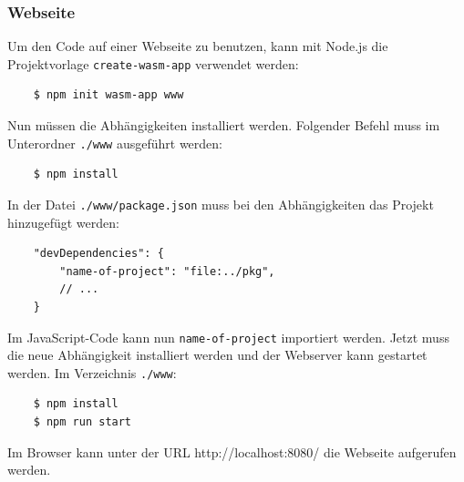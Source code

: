 \subsubsection{Webseite}

Um den Code auf einer Webseite zu benutzen, kann mit Node.js die Projektvorlage \verb"create-wasm-app" verwendet werden:

\begin{lstlisting}
    $ npm init wasm-app www
\end{lstlisting}

Nun müssen die Abhängigkeiten installiert werden. Folgender Befehl muss im Unterordner \verb"./www" ausgeführt werden:

\begin{lstlisting}
    $ npm install
\end{lstlisting}

In der Datei \verb"./www/package.json" muss bei den Abhängigkeiten das Projekt hinzugefügt werden:

\begin{lstlisting}
    "devDependencies": {
        "name-of-project": "file:../pkg",
        // ...
    }
\end{lstlisting}

Im JavaScript-Code kann nun \verb"name-of-project" importiert werden. Jetzt muss die neue Abhängigkeit installiert werden und der Webserver kann gestartet werden. Im Verzeichnis \verb"./www":

\begin{lstlisting}
    $ npm install
    $ npm run start
\end{lstlisting}

Im Browser kann unter der URL http://localhost:8080/ die Webseite aufgerufen werden.
